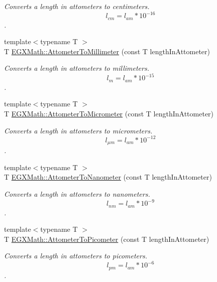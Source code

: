 \begin{DoxyCompactItemize}
\begin{DoxyCompactList}\small\item\em Converts a length in attometers to centimeters. \[ l_{cm}=l_{am} * 10^{-16} \]. \end{DoxyCompactList}\item 
{\footnotesize template$<$typename T $>$ }\\T \mbox{\hyperlink{group___e_g_x_math-_conversions-_length_conversions-_attometer-_s_i_gaa1844671e09a5d485145eb7cc152ba19}{E\+G\+X\+Math\+::\+Attometer\+To\+Millimeter}} (const T length\+In\+Attometer)
\begin{DoxyCompactList}\small\item\em Converts a length in attometers to millimeters. \[ l_{m}=l_{am} * 10^{-15} \]. \end{DoxyCompactList}\item 
{\footnotesize template$<$typename T $>$ }\\T \mbox{\hyperlink{group___e_g_x_math-_conversions-_length_conversions-_attometer-_s_i_gaa98a14657ea865a6cac8fb8fc42172a2}{E\+G\+X\+Math\+::\+Attometer\+To\+Micrometer}} (const T length\+In\+Attometer)
\begin{DoxyCompactList}\small\item\em Converts a length in attometers to micrometers. \[ l_{\mu m}=l_{am} * 10^{-12} \]. \end{DoxyCompactList}\item 
{\footnotesize template$<$typename T $>$ }\\T \mbox{\hyperlink{group___e_g_x_math-_conversions-_length_conversions-_attometer-_s_i_gacb010bf3c4fb120c4a43cf16c7d9c77f}{E\+G\+X\+Math\+::\+Attometer\+To\+Nanometer}} (const T length\+In\+Attometer)
\begin{DoxyCompactList}\small\item\em Converts a length in attometers to nanometers. \[ l_{nm}=l_{am} * 10^{-9} \]. \end{DoxyCompactList}\item 
{\footnotesize template$<$typename T $>$ }\\T \mbox{\hyperlink{group___e_g_x_math-_conversions-_length_conversions-_attometer-_s_i_ga46ccf47b501bffeb16bc792377e55991}{E\+G\+X\+Math\+::\+Attometer\+To\+Picometer}} (const T length\+In\+Attometer)
\begin{DoxyCompactList}\small\item\em Converts a length in attometers to picometers. \[ l_{pm}=l_{am} * 10^{-6} \]. \end{DoxyCompactList}\item 

\end{DoxyCompactItemize}
